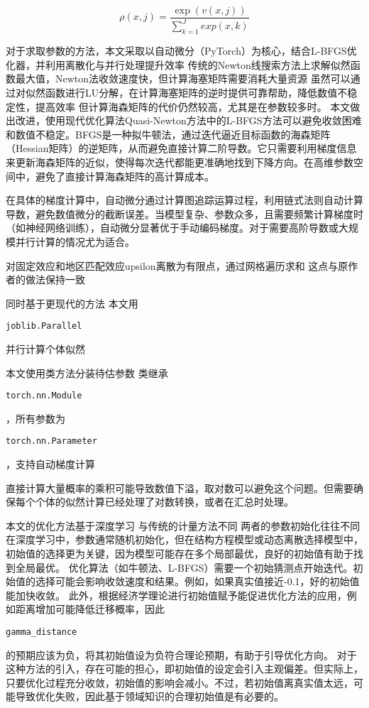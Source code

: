 \documentclass[a4paper,12pt]{article}
\begin{document}
\begin{equation}
  \rho(x,j)=\frac{\exp(v(x,j))}{\sum\limits_{k=1}^{J} exp(x,k)}
\end{equation}

对于求取参数的方法，本文采取以自动微分（PyTorch）为核心，结合L-BFGS优化器，并利用离散化与并行处理提升效率
传统的Newton线搜索方法上求解似然函数最大值，Newton法收敛速度快，但计算海塞矩阵需要消耗大量资源
虽然可以通过对似然函数进行LU分解，在计算海塞矩阵的逆时提供可靠帮助，降低数值不稳定性，提高效率
但计算海森矩阵的代价仍然较高，尤其是在参数较多时。
本文做出改进，使用现代优化算法Quasi-Newton方法中的L-BFGS方法可以避免收敛困难和数值不稳定。BFGS是一种拟牛顿法，通过迭代逼近目标函数的海森矩阵（Hessian矩阵）的逆矩阵，从而避免直接计算二阶导数。它只需要利用梯度信息来更新海森矩阵的近似，使得每次迭代都能更准确地找到下降方向。在高维参数空间中，避免了直接计算海森矩阵的高计算成本。

在具体的梯度计算中，自动微分通过计算图追踪运算过程，利用链式法则自动计算导数，避免数值微分的截断误差。当模型复杂、参数众多，且需要频繁计算梯度时（如神经网络训练），自动微分显著优于手动编码梯度。对于需要高阶导数或大规模并行计算的情况尤为适合。

对固定效应和地区匹配效应upsilon离散为有限点，通过网格遍历求和
这点与原作者的做法保持一致

同时基于更现代的方法
本文用\begin{verbatim}joblib.Parallel\end{verbatim}并行计算个体似然

本文使用类方法分装待估参数
类继承\begin{verbatim}torch.nn.Module\end{verbatim}，所有参数为\begin{verbatim}torch.nn.Parameter\end{verbatim}，支持自动梯度计算

直接计算大量概率的乘积可能导致数值下溢，取对数可以避免这个问题。但需要确保每个个体的似然计算已经处理了对数转换，或者在汇总时处理。

本文的优化方法基于深度学习
与传统的计量方法不同
两者的参数初始化往往不同
在深度学习中，参数通常随机初始化，但在结构方程模型或动态离散选择模型中，初始值的选择更为关键，因为模型可能存在多个局部最优，良好的初始值有助于找到全局最优。
优化算法（如牛顿法、L-BFGS）需要一个初始猜测点开始迭代。初始值的选择可能会影响收敛速度和结果。例如，如果真实值接近-0.1，好的初始值能加快收敛。
此外，根据经济学理论进行初始值赋予能促进优化方法的应用，例如距离增加可能降低迁移概率，因此\begin{verbatim}gamma_distance\end{verbatim}的预期应该为负，将其初始值设为负符合理论预期，有助于引导优化方向。
对于这种方法的引入，存在可能的担心，即初始值的设定会引入主观偏差。但实际上，只要优化过程充分收敛，初始值的影响会减小。不过，若初始值离真实值太远，可能导致优化失败，因此基于领域知识的合理初始值是有必要的。
\end{document}
